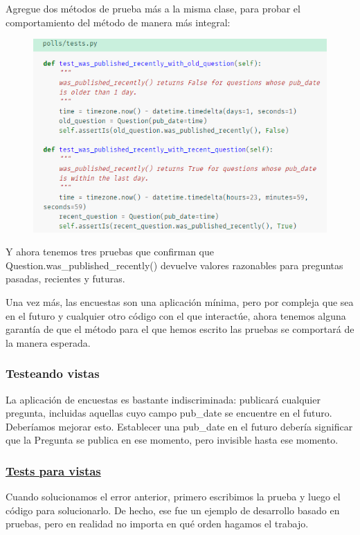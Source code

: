 \documentclass[10pt]{article}
\begin{document}
Agregue dos métodos de prueba más a la misma clase, para probar el comportamiento del método de manera más integral:
\begin{figure}[H]
\begin{center}
\includegraphics[scale=1]{figuras/3/35/356/img1.png}
\end{center}
\end{figure}
Y ahora tenemos tres pruebas que confirman que \textcolor{G}{Question.was\_published\_recently()} devuelve valores razonables para preguntas pasadas, recientes y futuras.

Una vez más, las encuestas son una aplicación mínima, pero por compleja que sea en el futuro y cualquier otro código con el que interactúe, ahora tenemos alguna garantía de que el método para el que hemos escrito las pruebas se comportará de la manera esperada.

\subsubsection{Testeando vistas}
La aplicación de encuestas es bastante indiscriminada: publicará cualquier pregunta, incluidas aquellas cuyo campo \textcolor{G}{pub\_date} se encuentre en el futuro. Deberíamos mejorar esto. Establecer una \textcolor{G}{pub\_date} en el futuro debería significar que la Pregunta se publica en ese momento, pero invisible hasta ese momento.

\subsubsection*{\underline{Tests para vistas}}
Cuando solucionamos el error anterior, primero escribimos la prueba y luego el código para solucionarlo. De hecho, ese fue un ejemplo de desarrollo basado en pruebas, pero en realidad no importa en qué orden hagamos el trabajo.
\end{document}
